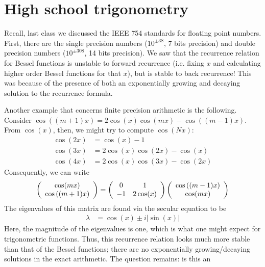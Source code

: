 \documentclass{mathnotes}
\begin{document}
\section{High school trigonometry}

Recall, last class we discussed the IEEE 754 standards for floating point numbers. First, there are the single precision numbers ($10^{\pm 38}$, 7 bits precision) and
double precision numbers ($10^{\pm308}$, 14 bits precision). We saw that the recurrence relation for Bessel functions is unstable to forward recurrence (i.e. fixing
$x$ and calculating higher order Bessel functions for that $x$), but is stable to back recurrence! This was because of the presence of both an exponentially growing
and decaying solution to the recurrence formula. 

Another example that concerns finite precision arithmetic is the following. Consider $\cos\left( (m+1)x \right)=2\cos(x)\cos(mx)-\cos\left( (m-1)x \right)$.
From $\cos(x)$, then, we might try to compute $\cos(Nx)$:
\begin{align*}
    \cos(2x)&=\cos(x)-1\\
    \cos(3x)&=2\cos(x)\cos(2x)-\cos(x)\\
    \cos(4x)&=2\cos(x)\cos(3x)-\cos(2x)
\end{align*}
Consequently, we can write
\begin{align*}
    \left(\begin{array}[]{c}
        \cos(mx)\\
        \cos\left( (m+1)x \right)
    \end{array}\right)
    =
    \left(\begin{array}[]{cc}
        0 & 1\\
        -1 & 2\cos(x)
    \end{array}\right)
    \left(
    \begin{array}[]{c}
        \cos\left( (m-1)x \right)\\
        \cos(mx)
    \end{array}
    \right)
\end{align*}
The eigenvalues of this matrix are found via the secular equation to be
\begin{align*}
    \lambda&=\cos(x)\pm i|\sin(x)|
\end{align*}
Here, the magnitude of the eigenvalues is one, which is what one might expect for trigonometric functions. Thus, this recurrence relation looks much more 
stable than that of the Bessel functions; there are no exponentially growing/decaying solutions in the exact arithmetic. The question remains: is this an
\end{document}
